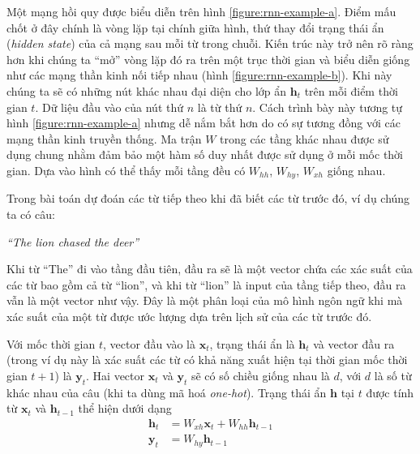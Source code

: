 Một mạng hồi quy được biểu diễn trên hình \ref{figure:rnn-example-a}. Điểm mấu chốt ở đây chính là vòng lặp tại chính giữa hình, thứ thay đổi trạng thái ẩn (\textit{hidden state}) của cả mạng sau mỗi từ trong chuỗi. Kiến trúc này trở nên rõ ràng hơn khi chúng ta “mở” vòng lặp đó ra trên một trục thời gian và biểu diễn giống như các mạng thần kinh nối tiếp nhau (hình \ref{figure:rnn-example-b}). Khi này chúng ta sẽ có những nút khác nhau đại diện cho lớp ẩn $\mathbf h_t$ trên mỗi điểm thời gian $t$. Dữ liệu đầu vào của nút thứ $n$ là từ thứ $n$. Cách trình bày này tương tự hình \ref{figure:rnn-example-a} nhưng dễ nắm bắt hơn do có sự tương đồng với các mạng thần kinh truyền thống. Ma trận $W$ trong các tầng khác nhau được sử dụng chung nhằm đảm bảo một hàm số duy nhất được sử dụng ở mỗi mốc thời gian. Dựa vào hình có thể thấy mỗi tầng đều có $W_{hh}$, $W_{hy}$, $W_{xh}$ giống nhau.

Trong bài toán dự đoán các từ tiếp theo khi đã biết các từ trước đó, ví dụ chúng ta có câu:\newline
\centerline{\textit{``The lion chased the deer''} \cite{Aggarwal2023-zk}}
Khi từ ``The'' đi vào tầng đầu tiên, đầu ra sẽ là một vector chứa các xác suất của các từ bao gồm cả từ ``lion'', và khi từ ``lion'' là input của tầng tiếp theo, đầu ra vẫn là một vector như vậy. Đây là một phân loại của mô hình ngôn ngữ khi mà xác suất của một từ được ước lượng dựa trên lịch sử của các từ trước đó.

Với mốc thời gian $t$, vector đầu vào là $\mathbf x_t$, trạng thái ẩn là $\mathbf h_t$ và vector đầu ra  (trong ví dụ này là xác suất các từ có khả năng xuất hiện tại thời gian mốc thời gian $t+1$) là $\mathbf y_t$. Hai vector $\mathbf x_t$ và $\mathbf y_t$ sẽ có số chiều giống nhau là $d$, với $d$ là số từ khác nhau của câu (khi ta dùng mã hoá \textit{one-hot}). Trạng thái ẩn $\mathbf h$ tại $t$ được tính từ $\mathbf x_t$ và $\mathbf h_{t-1}$ thể hiện dưới dạng
\begin{align}
    \mathbf h_t & =W_{xh}\mathbf x_t+W_{hh}\mathbf h_{t-1}\label{equation:rnn-h} \\
    \mathbf y_t & =W_{hy}\mathbf h_{t-1}\label{equation:rnn-y}
\end{align}

